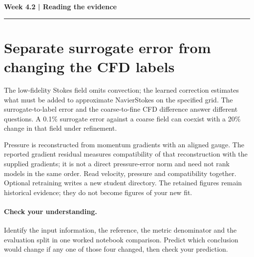 \documentclass[11pt]{article}
\begin{document}
\noindent\textbf{Week 4.2 | Reading the evidence}\par\medskip\hrule\medskip
\section*{Separate surrogate error from changing the CFD labels}
The low-fidelity Stokes field omits convection; the learned correction estimates
what must be added to approximate Navier\textendash{}Stokes on the specified grid. The
surrogate-to-label error and the coarse-to-fine CFD difference answer different
questions. A 0.1\% surrogate error against a coarse field can coexist with a 20\%
change in that field under refinement.

Pressure is reconstructed from momentum gradients with an aligned gauge. The
reported gradient residual measures compatibility of that reconstruction with
the supplied gradients; it is not a direct pressure-error norm and need not rank
models in the same order. Read velocity, pressure and compatibility together.
Optional retraining writes a new student directory. The retained figures remain
historical evidence; they do not become figures of your new fit.
\paragraph{Check your understanding.}
Identify the input information, the reference, the metric denominator and the
evaluation split in one worked notebook comparison. Predict which conclusion
would change if any one of those four changed, then check your prediction.
\end{document}
